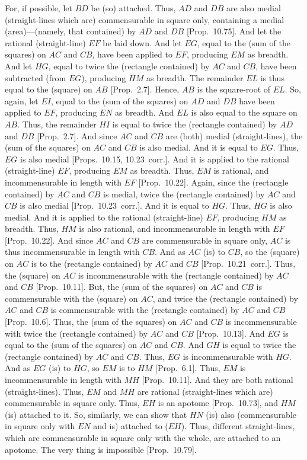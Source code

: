 \begin{Parallel}{}{}
{For, if possible, let $BD$ be (so) attached. Thus, $AD$ and $DB$ are also medial (straight-lines which
are) commensurable in square only, containing a medial (area)---(namely,
that contained) by $AD$ and $DB$ [Prop.~10.75].
And let the rational (straight-line) $EF$ be laid down. And let $EG$,
equal to the (sum of the squares) on $AC$ and $CB$, have been applied
to $EF$, producing $EM$ as breadth. And let $HG$, equal to twice
the (rectangle contained) by $AC$ and $CB$, have been subtracted
(from $EG$), producing $HM$ as breadth. The remainder $EL$ is
thus equal to the (square) on $AB$ [Prop.~2.7]. 
Hence, $AB$ is the square-root of $EL$. So, again, let $EI$, equal to
the (sum of the squares) on $AD$ and $DB$ have been applied to $EF$,
producing $EN$ as breadth. And $EL$ is also equal to the square
on $AB$. Thus, the remainder 
$HI$ is equal to twice the (rectangle contained) by $AD$ and $DB$ [Prop.~2.7]. And since $AC$ and $CB$ are
(both) medial (straight-lines), the (sum of the squares) on $AC$ and $CB$ is also medial.
And it is equal to $EG$. Thus, $EG$ is also medial [Props.~10.15, 10.23~corr.]. And it is
applied to the rational (straight-line) $EF$, producing $EM$ as breadth.
Thus, $EM$ is rational, and incommensurable in length with $EF$
[Prop.~10.22]. Again, since the (rectangle
contained) by $AC$ and $CB$ is medial, twice the (rectangle
contained) by $AC$ and $CB$ is also medial [Prop.~10.23~corr.]. And it is equal to $HG$.
Thus, $HG$ is also medial. And it is applied to the rational (straight-line)
$EF$, producing $HM$ as breadth. Thus, $HM$ is also rational, and
incommensurable in length with $EF$ [Prop.~10.22]. And since $AC$ and $CB$ are commensurable in square only, $AC$ is thus incommensurable in length with $CB$.  And as $AC$ (is)
to $CB$, so the (square) on $AC$
is to the (rectangle contained) by $AC$ and $CB$ [Prop.~10.21~corr.]. Thus, the (square) on $AC$
is incommensurable with the (rectangle contained) by $AC$ and $CB$
[Prop.~10.11].
But, the (sum of the squares) on $AC$ and $CB$ is commensurable
with the (square) on $AC$, and twice the (rectangle contained) by $AC$ and
$CB$ is commensurable with the (rectangle contained) by $AC$ and $CB$ [Prop.~10.6].
Thus, the (sum of the squares) on $AC$ and $CB$ is incommensurable
with twice the (rectangle contained) by $AC$ and $CB$ [Prop.~10.13]. And $EG$ is equal to
the (sum of the squares) on $AC$ and $CB$. And $GH$ is equal
to twice the (rectangle contained) by $AC$ and $CB$. Thus, 
$EG$ is incommensurable with $HG$. And as $EG$ (is) to $HG$,
so $EM$ is to $HM$ [Prop.~6.1]. 
Thus, $EM$ is incommensurable in length with $MH$ [Prop.~10.11]. And they are both rational (straight-lines).
Thus, $EM$ and $MH$ are rational (straight-lines which are)
commensurable in square only. Thus, $EH$ is an apotome
[Prop.~10.73], and $HM$ (is) attached to
it. So, similarly, we can show that $HN$ (is) also (commensurable
in square only with $EN$ and is) attached to ($EH$). 
Thus, different straight-lines, which are commensurable
in square only with the whole, are attached to an apotome.
The very thing is impossible [Prop.~10.79].

}
\end{Parallel}
